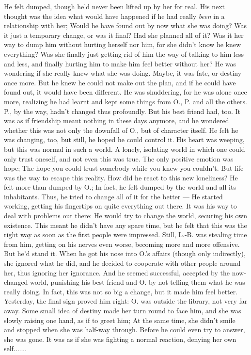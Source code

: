 He felt dumped, though he'd never been lifted up by her for real. His next thought was the idea what would have happened if he had really \emph{been} in a relationship with her; Would he have found out by now what she was doing? Was it just a temporary change, or was it final? Had she planned all of it? Was it her way to dump him without hurting herself nor him, for she didn't know he knew everything? 
Was she finally just getting rid of him the way of talking to him less and less, and finally hurting him to make him feel better without her? 
He was wondering if she really knew what she was doing. Maybe, it was fate, or destiny once more. But he knew he could not make out the plan, and if he could have found out, it would have been different. 
He was shuddering, for he was alone once more, realizing he had learnt and kept some things from O., P. and all the others. P., by the way, hadn't changed thus profoundly. 
But his best friend had, too. 
It was as if friendship meant nothing in these days anymore, and he wondered whether this was not only the downfall of O., but of character itself. He felt he was changing, too, but still, he hoped he could control it. His heart was weeping, but this was normal in such a world. 
A lonely, isolating world in which one could only trust oneself, and not even this was true. 
The only positive emotion was hope; The hope you could trust somebody while you knew you couldn't. But life was the way to escape this reality. 
How did he react to this new loneliness? 
He felt more than dumped by O.; In fact, he felt dumped by the world and all its inhabitants. Thus, he tried to change all of it for the better --- He started working, getting his fingertips on quite everything out there. It was his way to deal with problems out there: He would try to change the world, securing his own existence. 
This meant he didn't have any spare time, but he felt that this was the right way as soon as the first people were impressed. Still, L.-B. was stealing time from him, getting on his nerves even worse, becoming more and more offensive. 
But he'd stand it. 
When he got his nose into O.'s affairs (though only indirectly), she ignored what he did, and he decided to cooperate with other people around her, thus ignoring her ignorance. And he seemed successful, accepted by the now-changed world, punishing his best friend and O. by not telling them what he was really doing. In fact, this was not so big a change, but it made him feel better. 
Yesterday, the final sign proved him right: O. was outside the library, not very far away. Some small idea of destiny made her turn round to face him, and she was slowly raising one hand, as if to greet him; At the same time, she didn't smile and stopped when she was half-way through. Before he could even try to answer, she was gone. It was as if she was fighting a normal reaction, denying her own self....... 

